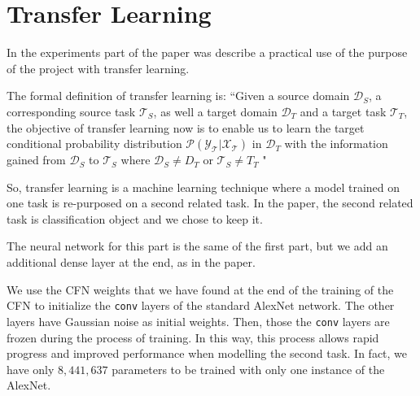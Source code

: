 \section{Transfer Learning}

In the experiments part of the paper was describe a practical use of the purpose of the project with transfer learning. 

The formal definition of transfer learning is: \textquotedblleft Given a source domain $\mathcal{D}_{S}$, a corresponding source task $\mathcal{T}_{S}$, as well a target domain $\mathcal{D}_{T}$ and a target task $\mathcal{T}_{T}$, the objective of transfer learning now is to enable us to learn the target conditional probability distribution $\mathcal{P(Y_{T}|X_{T})}$ in $\mathcal{D}_{T}$ with the information gained from $\mathcal{D}_{S}$ to $\mathcal{T}_{S}$ where $\mathcal{D}_{S} \neq {D}_{T}$ or $\mathcal{T}_{S} \neq {T}_{T}$ "

So, transfer learning is a machine learning technique where a model trained on one task is re-purposed on a second related task. In the paper, the second related task is classification object and we chose to keep it.

The neural network for this part is the same of the first part, but we add an additional dense layer at the end, as in the paper.

We use the CFN weights that we have found at the end of the training of the CFN to initialize the \texttt{conv} layers of the standard AlexNet network. The other layers have Gaussian noise as initial weights. Then, those the \texttt{conv} layers are frozen during the process of training. In this way, this process allows rapid progress and improved performance when modelling the second task. In fact, we have only $8,441,637$ parameters to be trained with only one instance of the AlexNet.

